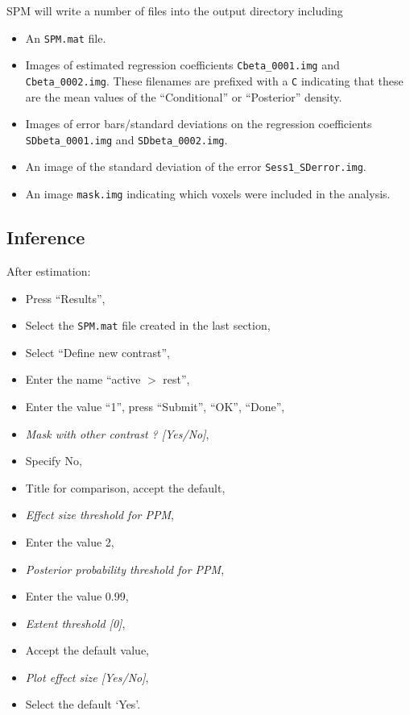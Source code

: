 SPM will write a number of files into the output directory including 

\begin{itemize}
\item An \texttt{SPM.mat} file.
\item Images of estimated regression coefficients  \texttt{Cbeta\_0001.img} and \texttt{Cbeta\_0002.img}. These filenames are prefixed with a \texttt{C} indicating that these are the mean values of the ``Conditional'' or ``Posterior'' density.
\item Images of error bars/standard deviations on the regression coefficients \texttt{SDbeta\_0001.img} and \texttt{SDbeta\_0002.img}.
\item An image of the standard deviation of the error \texttt{Sess1\_SDerror.img}.
\item An image \texttt{mask.img} indicating which voxels were included in the analysis.
\end{itemize}

\subsection{Inference}

After estimation:

\begin{itemize}
\item Press ``Results'',
\item Select the \texttt{SPM.mat} file created in the last section,
\item Select ``Define new contrast'',
\item Enter the name ``active $>$ rest'',
\item Enter the value ``1'', press ``Submit'', ``OK'', ``Done'',
\item \emph{Mask with other contrast ? [Yes/No]},
\item Specify No,
\item Title for comparison, accept the default,
\item \emph{Effect size threshold for PPM},
\item Enter the value 2,
\item \emph{Posterior probability threshold for PPM},
\item Enter the value 0.99,
\item \emph{Extent threshold [0]},
\item Accept the default value,
\item \emph{Plot effect size [Yes/No]},
\item Select the default `Yes'.
\end{itemize}

